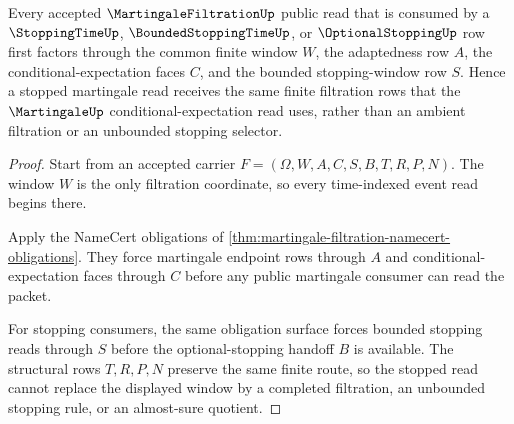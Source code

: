 \begin{theorem}
\label{thm:martingale-filtration-stopping-window-handoff}
Every accepted $\MartingaleFiltrationUp$ public read that is consumed by a $\StoppingTimeUp$, $\BoundedStoppingTimeUp$, or $\OptionalStoppingUp$ row first factors through the common finite window $W$, the adaptedness row $A$, the conditional-expectation faces $C$, and the bounded stopping-window row $S$. Hence a stopped martingale read receives the same finite filtration rows that the $\MartingaleUp$ conditional-expectation read uses, rather than an ambient filtration or an unbounded stopping selector.
\end{theorem}
\begin{proof}
Start from an accepted carrier $F=(\Omega,W,A,C,S,B,T,R,P,N)$. The window $W$ is the only filtration coordinate, so every time-indexed event read begins there.

Apply the NameCert obligations of \autoref{thm:martingale-filtration-namecert-obligations}. They force martingale endpoint rows through $A$ and conditional-expectation faces through $C$ before any public martingale consumer can read the packet.

For stopping consumers, the same obligation surface forces bounded stopping reads through $S$ before the optional-stopping handoff $B$ is available. The structural rows $T,R,P,N$ preserve the same finite route, so the stopped read cannot replace the displayed window by a completed filtration, an unbounded stopping rule, or an almost-sure quotient.
\end{proof}


\begin{closurestatus}{\MartingaleFiltrationUp}
  \theoryclosure{\seedClosure}
  \formalstatus{\theoremCheckedV}
\end{closurestatus}
